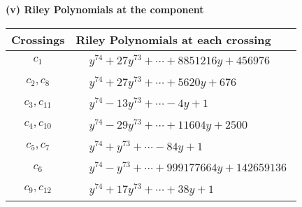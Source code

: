 \documentclass[1p]{elsarticle_modified}
\theoremstyle{definition}
\begin{document}
\flushleft \textbf{(v) Riley Polynomials at the component}\newline \\
\begin{tabular}{m{50pt}|m{274pt}}
Crossings & \hspace{64pt}Riley Polynomials at each crossing \\
\hline $$\begin{aligned}c_{1}\end{aligned}$$&$\begin{aligned}
&y^{74}+27 y^{73}+\cdots+8851216 y+456976
\end{aligned}$\\
\hline $$\begin{aligned}c_{2},c_{8}\end{aligned}$$&$\begin{aligned}
&y^{74}+27 y^{73}+\cdots+5620 y+676
\end{aligned}$\\
\hline $$\begin{aligned}c_{3},c_{11}\end{aligned}$$&$\begin{aligned}
&y^{74}-13 y^{73}+\cdots-4 y+1
\end{aligned}$\\
\hline $$\begin{aligned}c_{4},c_{10}\end{aligned}$$&$\begin{aligned}
&y^{74}-29 y^{73}+\cdots+11604 y+2500
\end{aligned}$\\
\hline $$\begin{aligned}c_{5},c_{7}\end{aligned}$$&$\begin{aligned}
&y^{74}+y^{73}+\cdots-84 y+1
\end{aligned}$\\
\hline $$\begin{aligned}c_{6}\end{aligned}$$&$\begin{aligned}
&y^{74}- y^{73}+\cdots+999177664 y+142659136
\end{aligned}$\\
\hline $$\begin{aligned}c_{9},c_{12}\end{aligned}$$&$\begin{aligned}
&y^{74}+17 y^{73}+\cdots+38 y+1
\end{aligned}$\\
\hline
\end{tabular}\\~\\
\end{document}
